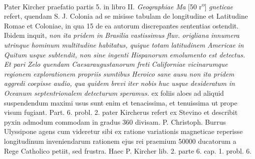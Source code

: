 \pstart Pater Kircher praefatio partis 5. in libro II. \textit{Geographiae Ma}
[50 r\textsuperscript{o}] \cite{00067}\textit{gneticae} refert, quendam S. J. Colonia\protect{} ad se misisse tabulam de longitudine\protect{} et Latitudine\protect{} Romae\protect{} et Coloniae\protect{}, in qua 15 de ea autorum discrepantes sententias ostendit. Ibidem inquit, \textit{non ita pridem in }\textit{Brasilia}\protect{}\textit{ vastissimus fluv. }\textit{origliana}\protect{}\textit{ innumera utrinque hominum multitudine habitatus, quique totam }\textit{latitudinem}\protect{}\textit{ }\textit{Americae}\protect{} \textit{in } \textit{Quitum}\protect{}\textit{ usque subtendit, non sine ingenti Hispanorum emolumento est detectus. Et pari Zelo quendam Caesaraugustanorum freti }\textit{Californiae}\protect{}\textit{ vicinarumque regionem explorationem propriis sumtibus Heroico sane ausu non ita pridem aggredi coepisse audio, qua quidem brevi iter nobis huc usque desideratum in }\textit{Oceanum septentrionalem}\protect{}\textit{ detecturum speramus.} \pend 
\pstart {} ex foliis aloes ad aliquid suspendendum maximi usus sunt enim et tenacissima, et tenuissima ut prope visum fugiant.
\pend 
\pstart Part. 6. probl. 2. pater Kircherus\protect{} refert ex Stevino\protect{} et describit pyxin admodum commodam in gradus 360 divisam.
\pend 
\pstart P. Christoph. Burrus\protect{} Ulyssipone\protect{} agens cum videretur sibi ex ratione variationis magneticae reperisse longitudinum\protect{} inveniendarum rationem ejus rei praemium 50000 ducatorum a Rege Catholico petiit, sed frustra. Haec P. Kircher lib. 2. parte 6. cap. 1. probl. 6. 
